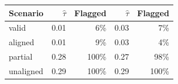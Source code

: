 \begin{tabular}{lrrrr}
\toprule
Scenario & $\hat\tau$ & Flagged & $\hat\tau$ & Flagged \\
\midrule
valid & 0.01 & 6\% & 0.03 & 7\% \\
aligned & 0.01 & 9\% & 0.03 & 4\% \\
partial & 0.28 & 100\% & 0.27 & 98\% \\
unaligned & 0.29 & 100\% & 0.29 & 100\% \\
\bottomrule
\end{tabular}
